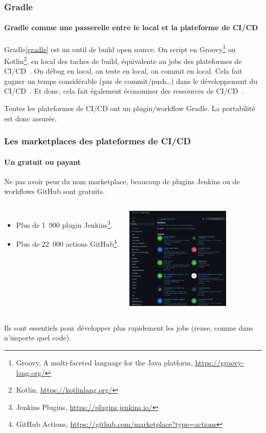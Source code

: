 \documentclass{beamer}
\begin{document}
    \begin{frame}
        \frametitle{Gradle}
        \framesubtitle{Gradle comme une passerelle entre le local et la plateforme de CI/CD}
        \transdissolve
        Gradle\cref{gradle} est un outil de build open source.
        On script en Groovy\footnote{\label{groovy}Groovy, A multi-faceted language for the Java platform, \url{https://groovy-lang.org/}} ou Kotlin\footnote{Kotlin, \url{https://kotlinlang.org/}}, en local des taches de build, équivalente au jobs des plateformes de CI/CD~.
        \bigbreak
        On débug en local, on teste en local, on commit en local.
        Cela fait gagner un temps considérable (pas de commit/push\ldots) dans le développement du CI/CD~.
        Et donc, cela fait également économiser des ressources de CI/CD~.
        \begin{dangercolorbox}
            Toutes les plateformes de CI/CD ont un plugin/workflow Gradle.
            La portabilité est donc assurée.
        \end{dangercolorbox}
    \end{frame}

    \begin{frame}
        \frametitle{Les marketplaces des plateformes de CI/CD}
        \framesubtitle{Un  gratuit ou payant}
        \transdissolve
        Ne pas avoir peur du nom marketplace, beaucoup de plugins Jenkins ou de workflows GitHub sont gratuits.
        \begin{columns}
            \begin{itemize}
                \item Plus de 1~900 plugin Jenkins\footnote[frame]{Jenkins Plugins, \url{https://plugins.jenkins.io/}}.
                \item Plus de 22~000 actions GitHub\footnote[frame]{GitHub Actions, \url{https://github.com/marketplace?type=actions}}.
            \end{itemize}
            \centering
            \includegraphics[width=5cm]{image/github-marketplace.png}
        \end{columns}
        Ils sont essentiels pour développer plus rapidement les jobs (reuse, comme dans n'importe quel code).
    \end{frame}
\end{document}
